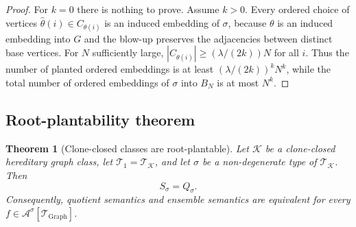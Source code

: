 \documentclass[11pt]{article}
\newtheorem{theorem}{Theorem}
\theoremstyle{definition}
\newcommand{\A}{\mathcal{A}}
\newcommand{\K}{\mathcal{K}}
\newcommand{\T}{\mathcal{T}}
\begin{document}
\begin{proof}
For $k=0$ there is nothing to prove.  Assume $k>0$.  Every ordered choice of
vertices $\widehat\theta(i)\in C_{\theta(i)}$ is an induced embedding of $\sigma$,
because $\theta$ is an induced embedding into $G$ and the blow-up preserves the
adjacencies between distinct base vertices.  For $N$ sufficiently large,
$|C_{\theta(i)}|\ge(\lambda/(2k))N$ for all $i$.  Thus the number of planted
ordered embeddings is at least $(\lambda/(2k))^kN^k$, while the total number of
ordered embeddings of $\sigma$ into $B_N$ is at most $N^k$.
\end{proof}

\subsection{Root-plantability theorem}

\begin{theorem}[Clone-closed classes are root-plantable]\label{thm:clone-root-plantable}
Let $\K$ be a clone-closed hereditary graph class, let
$\T_1=\T_\K$, and let $\sigma$ be a non-degenerate type of $\T_\K$.  Then
\[
  S_\sigma=Q_\sigma.
\]
Consequently, quotient semantics and ensemble semantics are equivalent for every
$f\in\A^\sigma[\T_{\mathrm{Graph}}]$.
\end{theorem}
\end{document}
